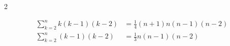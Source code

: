 \documentclass[../../../../main.tex]{subfiles}
\begin{document}
\begin{multicols}{2}

    \begin{align*}
        \sum_{k=2}^n k(k-1)(k-2)
                                & = \frac{1}{4} (n+1)n(n-1)(n-2) \\
        \sum_{k=2}^n (k-1)(k-2) & = \frac{1}{3} n(n-1)(n-2)
    \end{align*}
    \newpage
\end{multicols}
\end{document}
